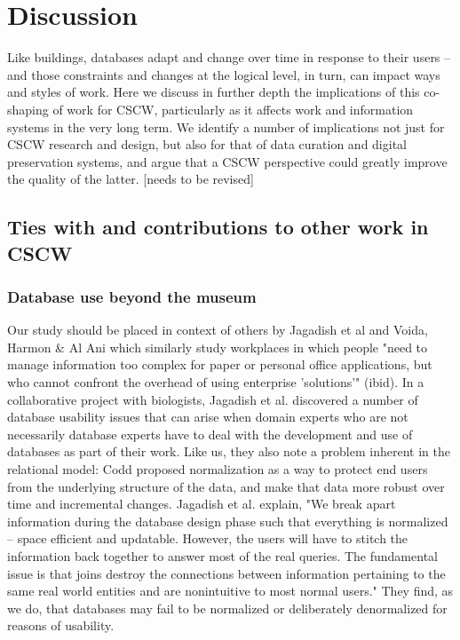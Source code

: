 \section{Discussion}

Like buildings, databases adapt and change over time in response to their users -- and those constraints and changes at the logical level, in turn, can impact ways and styles of work.  Here we discuss in further depth the implications of this co-shaping of work for CSCW, particularly as it affects work and information systems in the very long term. We identify a number of implications not just for CSCW research and design, but also for that of data curation and digital preservation systems, and argue that a CSCW perspective could greatly improve the quality of the latter. [needs to be revised]

\subsection {Ties with and contributions to other work in CSCW}
\subsubsection{Database use beyond the museum}

Our study should be placed in context of others by Jagadish et al \cite{jagadish2007making} and Voida, Harmon & Al Ani \cite{voida2011homebrew} which similarly study workplaces in which people "need to manage information too complex for paper or personal office applications, but who cannot confront the overhead of using enterprise 'solutions'" (ibid). In a collaborative project with biologists, Jagadish et al. discovered a number of database usability issues that can arise when domain experts who are not necessarily database experts have to deal with the development and use of databases as part of their work. Like us, they also note a problem inherent in the relational model: Codd proposed normalization as a way to protect end users from the underlying structure of the data, and make that data more robust over time and incremental changes. Jagadish et al. explain, "We break apart information during the database design phase such that everything is normalized -- space efficient and updatable. However, the users will have to stitch the information back together to answer most of the real queries. The fundamental issue is that joins destroy the connections between information pertaining to the same real world entities and are nonintuitive to most normal users."  They find, as we do, that databases may fail to be normalized or deliberately denormalized for reasons of usability.

